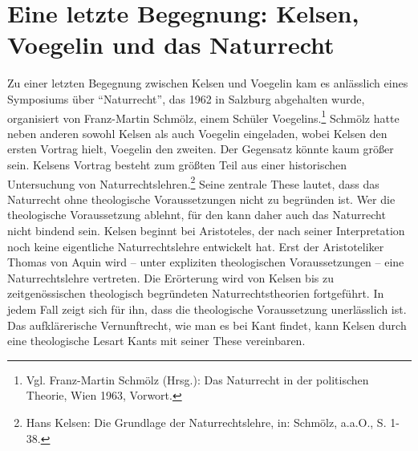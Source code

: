 \documentclass[12pt,a4paper,ngerman]{article}
\begin{document}
\section{Eine letzte Begegnung: Kelsen, Voegelin und das Naturrecht}

Zu einer letzten Begegnung zwischen Kelsen und Voegelin kam es anlässlich
eines Symposiums über "`Naturrecht"', das 1962 in Salzburg abgehalten wurde,
organisiert von Franz-Martin Schmölz, einem Schüler Voegelins.\footnote{Vgl.
  Franz-Martin Schmölz (Hrsg.): Das Naturrecht in der politischen Theorie,
  Wien 1963, Vorwort.} Schmölz hatte neben anderen sowohl Kelsen als auch
Voegelin eingeladen, wobei Kelsen den ersten Vortrag hielt, Voegelin den
zweiten. Der Gegensatz könnte kaum größer sein.  Kelsens Vortrag besteht zum
größten Teil aus einer historischen Untersuchung von
Naturrechtslehren.\footnote{Hans Kelsen: Die Grundlage der Naturrechtslehre,
  in: Schmölz, a.a.O., S. 1-38.} Seine zentrale These lautet, dass das
Naturrecht ohne theologische Voraussetzungen nicht zu begründen ist. Wer die
theologische Voraussetzung ablehnt, für den kann daher auch das Naturrecht
nicht bindend sein. Kelsen beginnt bei Aristoteles, der nach seiner
Interpretation noch keine eigentliche Naturrechtslehre entwickelt hat. Erst
der Aristoteliker Thomas von Aquin wird -- unter expliziten theologischen
Voraussetzungen -- eine Naturrechtslehre vertreten. Die Erörterung wird von
Kelsen bis zu zeitgenössischen theologisch begründeten Naturrechtstheorien
fortgeführt. In jedem Fall zeigt sich für ihn, dass die theologische
Voraussetzung unerlässlich ist.  Das aufklärerische Vernunftrecht, wie man es
bei Kant findet, kann Kelsen durch eine theologische Lesart Kants mit seiner
These vereinbaren.
\end{document}
